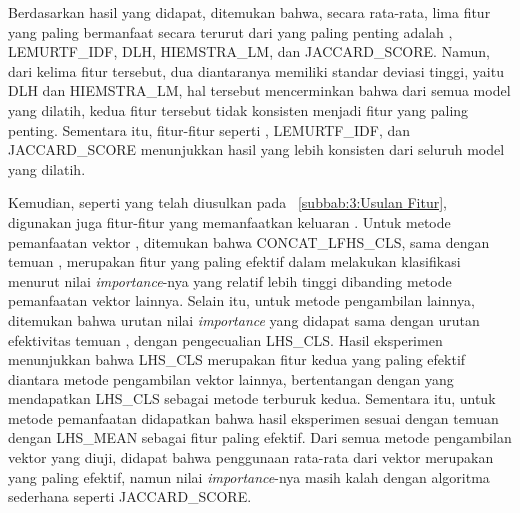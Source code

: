 Berdasarkan hasil yang didapat, ditemukan bahwa, secara rata-rata, lima fitur yang paling bermanfaat secara terurut dari yang paling penting adalah \obm{}, LEMURTF\_IDF, DLH, HIEMSTRA\_LM, dan JACCARD\_SCORE. Namun, dari kelima fitur tersebut, dua diantaranya memiliki standar deviasi tinggi, yaitu DLH dan HIEMSTRA\_LM, hal tersebut mencerminkan bahwa dari semua model \lambdamart{} yang dilatih, kedua fitur tersebut tidak konsisten menjadi fitur yang paling penting. Sementara itu, fitur-fitur seperti \obm{}, LEMURTF\_IDF, dan JACCARD\_SCORE menunjukkan hasil yang lebih konsisten dari seluruh model yang dilatih.


Kemudian, seperti yang telah diusulkan pada \subbab{}~\ref{subbab:3:Usulan Fitur}, digunakan juga fitur-fitur yang memanfaatkan keluaran \encoder{}. Untuk metode pemanfaatan vektor \encoder{} \bert{}, ditemukan bahwa CONCAT\_LFHS\_CLS, sama dengan temuan \citeauthor{devlin2018bert}, merupakan fitur yang paling efektif dalam melakukan klasifikasi menurut nilai \textit{importance}-nya yang relatif lebih tinggi dibanding metode pemanfaatan vektor \bert{} lainnya. Selain itu, untuk metode pengambilan lainnya, ditemukan bahwa urutan nilai \textit{importance} yang didapat sama dengan urutan efektivitas temuan \citeauthor{devlin2018bert}, dengan pengecualian LHS\_CLS. Hasil eksperimen menunjukkan bahwa LHS\_CLS merupakan fitur kedua yang paling efektif diantara metode pengambilan vektor \bert{} lainnya, bertentangan dengan \citeauthor{devlin2018bert} yang mendapatkan LHS\_CLS sebagai metode terburuk kedua. Sementara itu, untuk metode pemanfaatan \encoder{} \tfive{} didapatkan bahwa hasil eksperimen sesuai dengan temuan \citeauthor{ni2021sentence} dengan LHS\_MEAN sebagai fitur paling efektif. Dari semua metode pengambilan vektor yang diuji, didapat bahwa penggunaan rata-rata dari vektor \hs{} \tfive{} merupakan yang paling efektif, namun nilai \textit{importance}-nya masih kalah dengan algoritma sederhana seperti JACCARD\_SCORE.

